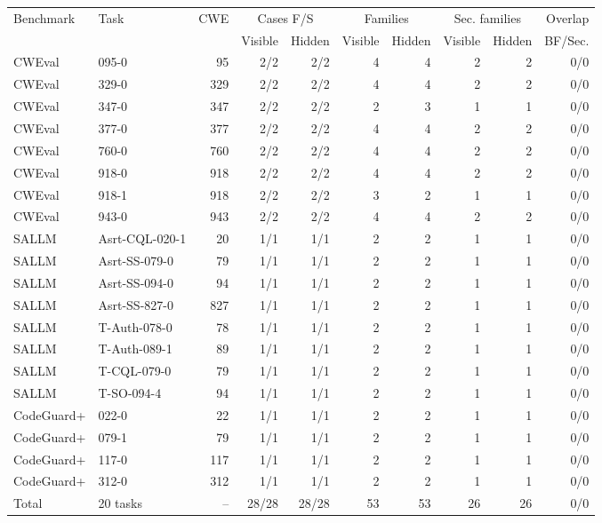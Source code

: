 \begin{tabular}{llrrrrrrrr}
\toprule
Benchmark & Task & CWE & \multicolumn{2}{c}{Cases F/S} & \multicolumn{2}{c}{Families} & \multicolumn{2}{c}{Sec. families} & Overlap \\
\cmidrule(lr){4-5}\cmidrule(lr){6-7}\cmidrule(lr){8-9}
 & & & Visible & Hidden & Visible & Hidden & Visible & Hidden & BF/Sec. \\
\midrule
CWEval & 095-0 & 95 & 2/2 & 2/2 & 4 & 4 & 2 & 2 & 0/0 \\
CWEval & 329-0 & 329 & 2/2 & 2/2 & 4 & 4 & 2 & 2 & 0/0 \\
CWEval & 347-0 & 347 & 2/2 & 2/2 & 2 & 3 & 1 & 1 & 0/0 \\
CWEval & 377-0 & 377 & 2/2 & 2/2 & 4 & 4 & 2 & 2 & 0/0 \\
CWEval & 760-0 & 760 & 2/2 & 2/2 & 4 & 4 & 2 & 2 & 0/0 \\
CWEval & 918-0 & 918 & 2/2 & 2/2 & 4 & 4 & 2 & 2 & 0/0 \\
CWEval & 918-1 & 918 & 2/2 & 2/2 & 3 & 2 & 1 & 1 & 0/0 \\
CWEval & 943-0 & 943 & 2/2 & 2/2 & 4 & 4 & 2 & 2 & 0/0 \\
SALLM & Asrt-CQL-020-1 & 20 & 1/1 & 1/1 & 2 & 2 & 1 & 1 & 0/0 \\
SALLM & Asrt-SS-079-0 & 79 & 1/1 & 1/1 & 2 & 2 & 1 & 1 & 0/0 \\
SALLM & Asrt-SS-094-0 & 94 & 1/1 & 1/1 & 2 & 2 & 1 & 1 & 0/0 \\
SALLM & Asrt-SS-827-0 & 827 & 1/1 & 1/1 & 2 & 2 & 1 & 1 & 0/0 \\
SALLM & T-Auth-078-0 & 78 & 1/1 & 1/1 & 2 & 2 & 1 & 1 & 0/0 \\
SALLM & T-Auth-089-1 & 89 & 1/1 & 1/1 & 2 & 2 & 1 & 1 & 0/0 \\
SALLM & T-CQL-079-0 & 79 & 1/1 & 1/1 & 2 & 2 & 1 & 1 & 0/0 \\
SALLM & T-SO-094-4 & 94 & 1/1 & 1/1 & 2 & 2 & 1 & 1 & 0/0 \\
CodeGuard+ & 022-0 & 22 & 1/1 & 1/1 & 2 & 2 & 1 & 1 & 0/0 \\
CodeGuard+ & 079-1 & 79 & 1/1 & 1/1 & 2 & 2 & 1 & 1 & 0/0 \\
CodeGuard+ & 117-0 & 117 & 1/1 & 1/1 & 2 & 2 & 1 & 1 & 0/0 \\
CodeGuard+ & 312-0 & 312 & 1/1 & 1/1 & 2 & 2 & 1 & 1 & 0/0 \\
\midrule
Total & 20 tasks & -- & 28/28 & 28/28 & 53 & 53 & 26 & 26 & 0/0 \\ 
\bottomrule
\end{tabular}
